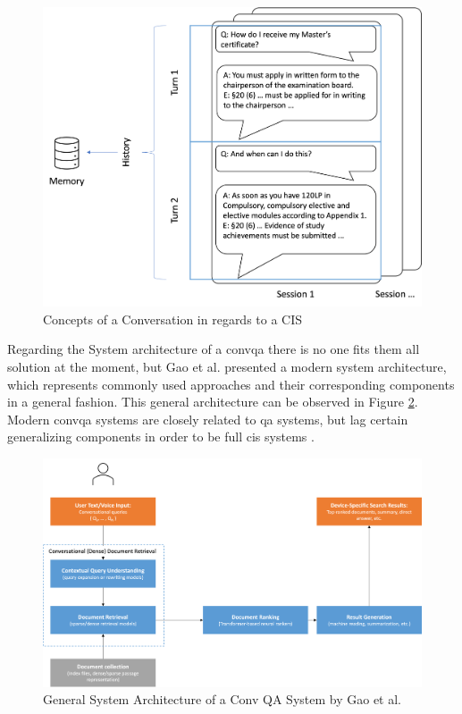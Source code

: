\begin{figure}[h]
    \centering
    \includegraphics[width=\textwidth]{Grafiken/Conversation_Explain.png}
    \caption{Concepts of a Conversation in regards to a CIS}
    \label{fig:conversation_explain}
\end{figure}

Regarding the System architecture of a \gls{convqa} there is no one fits them all solution at the moment, but Gao et al. \cite{gao_neural_2022} presented a modern system architecture, which represents commonly used approaches and their corresponding components in a general fashion. This general architecture can be observed in Figure \ref{fig:convqa_system_architecture}. Modern \gls{convqa} systems are closely related to \gls{qa} systems, but lag certain generalizing components in order to be full \gls{cis} systems \cite{zamani_conversational_2023}.

\begin{figure}
    \centering
    \includegraphics[width=\textwidth]{Grafiken/System_Architecture_ConQA.png}
    \caption{General System Architecture of a Conv QA System by Gao et al. \cite{gao_neural_2022}}
    \label{fig:convqa_system_architecture}
\end{figure}


